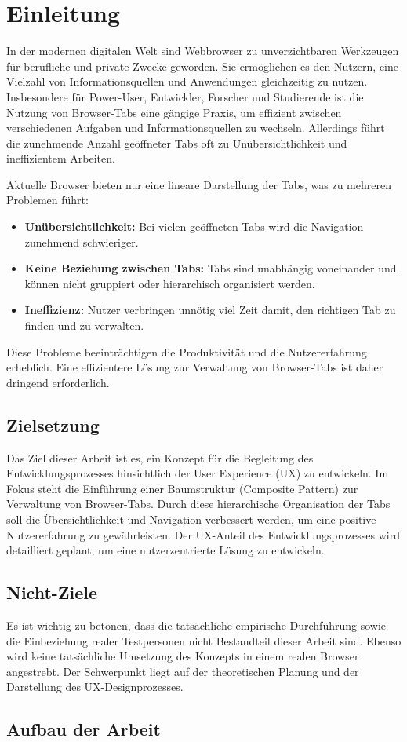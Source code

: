 \section{Einleitung}
In der modernen digitalen Welt sind Webbrowser zu unverzichtbaren Werkzeugen für berufliche und private Zwecke geworden. 
Sie ermöglichen es den Nutzern, eine Vielzahl von Informationsquellen und Anwendungen gleichzeitig zu nutzen. 
Insbesondere für Power-User, Entwickler, Forscher und Studierende ist die Nutzung von Browser-Tabs eine gängige Praxis, um effizient zwischen verschiedenen Aufgaben und Informationsquellen zu wechseln. 
Allerdings führt die zunehmende Anzahl geöffneter Tabs oft zu Unübersichtlichkeit und ineffizientem Arbeiten.

Aktuelle Browser bieten nur eine lineare Darstellung der Tabs, was zu mehreren Problemen führt:
\begin{itemize}
    \item \textbf{Unübersichtlichkeit:} Bei vielen geöffneten Tabs wird die Navigation zunehmend schwieriger.
    \item \textbf{Keine Beziehung zwischen Tabs:} Tabs sind unabhängig voneinander und können nicht gruppiert oder hierarchisch organisiert werden.
    \item \textbf{Ineffizienz:} Nutzer verbringen unnötig viel Zeit damit, den richtigen Tab zu finden und zu verwalten.
\end{itemize}
Diese Probleme beeinträchtigen die Produktivität und die Nutzererfahrung erheblich. 
Eine effizientere Lösung zur Verwaltung von Browser-Tabs ist daher dringend erforderlich.

\subsection{Zielsetzung}
Das Ziel dieser Arbeit ist es, ein Konzept für die Begleitung des Entwicklungsprozesses hinsichtlich der User Experience (UX) zu entwickeln. 
Im Fokus steht die Einführung einer Baumstruktur (Composite Pattern) zur Verwaltung von Browser-Tabs. 
Durch diese hierarchische Organisation der Tabs soll die Übersichtlichkeit und Navigation verbessert werden, um eine positive Nutzererfahrung zu gewährleisten. 
Der UX-Anteil des Entwicklungsprozesses wird detailliert geplant, um eine nutzerzentrierte Lösung zu entwickeln.

\subsection{Nicht-Ziele}
Es ist wichtig zu betonen, dass die tatsächliche empirische Durchführung sowie die Einbeziehung realer Testpersonen nicht Bestandteil dieser Arbeit sind. 
Ebenso wird keine tatsächliche Umsetzung des Konzepts in einem realen Browser angestrebt. 
Der Schwerpunkt liegt auf der theoretischen Planung und der Darstellung des UX-Designprozesses.

\subsection{Aufbau der Arbeit}
